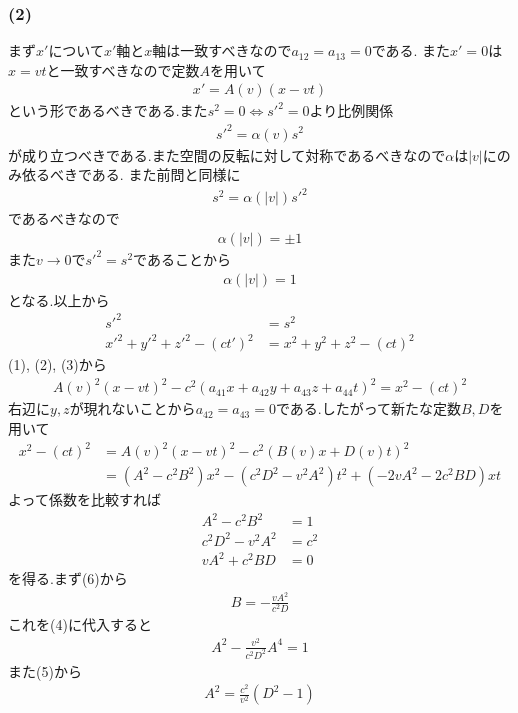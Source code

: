 \documentclass[uplatex,a4j,11pt,dvipdfmx]{jsarticle}
\begin{document}
\subsubsection*{(2)}
まず$x'$について$x'$軸と$x$軸は一致すべきなので$a_{12}=a_{13}=0$である.
また$x'=0$は$x=vt$と一致すべきなので定数$A$を用いて
\begin{align}
  x'=A(v)(x-vt)
\end{align}
という形であるべきである.また$s^2=0\Leftrightarrow s'^2=0$より比例関係
\begin{align*}
  s'^2=\alpha(v)s^2
\end{align*}
が成り立つべきである.また空間の反転に対して対称であるべきなので$\alpha$は$|v|$にのみ依るべきである.
また前問と同様に
\begin{align*}
  s^2=\alpha(|v|)s'^2
\end{align*}
であるべきなので
\begin{align*}
  \alpha(|v|)=\pm1
\end{align*}
また$v\rightarrow 0$で$s'^2=s^2$であることから
\begin{align*}
  \alpha(|v|)=1
\end{align*}
となる.以上から
\begin{align*}
  s'^2&=s^2\\
  x'^2+y'^2+z'^2-(ct')^2&=x^2+y^2+z^2-(ct)^2
\end{align*}
(1), (2), (3)から
\begin{align*}
  A(v)^2(x-vt)^2-c^2(a_{41}x+a_{42}y+a_{43}z+a_{44}t)^2=x^2-(ct)^2
\end{align*}
右辺に$y,z$が現れないことから$a_{42}=a_{43}=0$である.したがって新たな定数$B, D$を用いて
\begin{align*}
  x^2-(ct)^2&=A(v)^2(x-vt)^2-c^2(B(v)x+D(v)t)^2\\
  &=(A^2-c^2B^2)x^2-(c^2D^2-v^2A^2)t^2+(-2vA^2-2c^2BD)xt
\end{align*}
よって係数を比較すれば
\begin{align}
  A^2-c^2B^2&=1\\
  c^2D^2-v^2A^2&=c^2\\
  vA^2+c^2BD&=0
\end{align}
を得る.まず(6)から
\begin{align*}
  B=-\frac{vA^2}{c^2D}
\end{align*}
これを(4)に代入すると
\begin{align*}
  A^2-\frac{v^2}{c^2D^2}A^4=1
\end{align*}
また(5)から
\begin{align}
  A^2=\frac{c^2}{v^2}(D^2-1)
\end{align}
\end{document}
